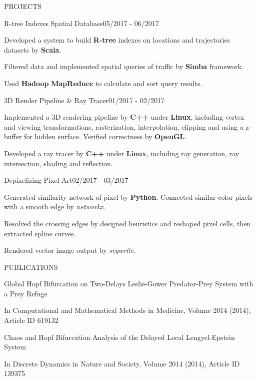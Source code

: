 \documentclass{resume} %
\begin{document}
\begin{rSection}{PROJECTS}
\begin{rSubsection}{R-tree Indexes Spatial Database}{05/2017 - 06/2017}{}{}
\item Developed a system to build {\bf R-tree} indexes on locations and trajectories datasets by {\bf Scala}.
\item Filtered data and implemented spatial queries of traffic by {\bf Simba} framework.
\item Used {\bf Hadoop} {\bf MapReduce} to calculate and sort query results. 
\end{rSubsection}
\begin{rSubsection}{3D Render Pipeline \& Ray Tracer}{01/2017 - 02/2017}{}{} 
\item Implemented a 3D rendering pipeline by {\bf C++} under {\bf Linux}, including vertex and viewing transformations, rasterization, interpolation, clipping and using a z-buffer for hidden surface. Verified correctness by {\bf OpenGL}. 
\item Developed a ray tracer by {\bf C++} under {\bf Linux}, including ray generation, ray intersection, shading and reflection.
\end{rSubsection} 
\begin{rSubsection}{Depixelizing Pixel Art}{02/2017 - 03/2017}{}{} 
\item Generated similarity network of pixel by {\bf Python}. Connected similar color pixels with a smooth edge by \emph{networkx}. 
\item Resolved the crossing edges by designed heuristics and reshaped pixel cells, then extracted spline curves. 
\item Rendered vector image output by \emph{svgwrite}.
\end{rSubsection} 
\end{rSection} 
\begin{rSection}{PUBLICATIONS} 
\begin{rSubsection}{Global Hopf Bifurcation on Two-Delays Leslie-Gower Predator-Prey System with a Prey Refuge}{} {} {} 
\item In Computational and Mathematical Methods in Medicine, Volume 2014 (2014), Article ID 619132 
\end{rSubsection}
\begin{rSubsection}{Chaos and Hopf Bifurcation Analysis of the Delayed Local Lengyel-Epstein System}{} {} {} 
\item In
Discrete Dynamics in Nature and Society, Volume 2014 (2014), Article ID 139375
\end{rSubsection}
\end{rSection}
\end{document}
